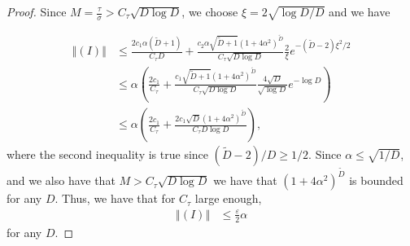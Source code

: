 \documentclass[12pt]{article}
\theoremstyle{remark}
\newcommand{\eps}{\varepsilon}
\newcommand{\norm}[1]{\left\Vert #1 \right\Vert}
\newcommand{\wtilde}[1]{\widetilde{#1}}
\newcommand{\stau}{\tau}
\begin{document}
\begin{appendices}
\begin{proof}
Since $M = \frac{\tau}{\sigma}>C_\stau\sqrt{D \log D}$, we choose $\xi = 2\sqrt{\log D/D}$ and we have

\begin{align*}
    \norm{(I)} 
&\leq \frac{2c_1 \alpha(\wtilde D+1)}{C_\stau D} + \frac{c_2 \alpha \sqrt{\wtilde D+1}( 1 + 4\alpha^2)^{\wtilde D} }
{C_\stau\sqrt{D \log D}}\frac{2}{\xi}e^{-(\wtilde D - 2 )\xi^2/2}
\\
&\leq \alpha\left(\frac{2c_1 }{C_\stau} + \frac{c_1 \sqrt{\wtilde D+1}( 1 + 4\alpha^2)^{\wtilde D} } 
{C_\stau\sqrt{D\log D }}\frac{4\sqrt{D}}{\sqrt{\log D}}e^{-\log D}\right)
\\
&\leq \alpha\left(\frac{2c_1 }{C_\stau} + \frac{2c_1 \sqrt{D}( 1 + 4\alpha^2)^{\wtilde D} }
{C_\stau D\log D }\right)
,\end{align*}
where the second inequality is true since  $(\wtilde D-2)/D \geq 1/2$.
Since $\alpha \leq  \sqrt{1/D} $, and we also have that $M>C_\stau\sqrt{D \log D}$ we have that 
$( 1 + 4\alpha^2)^{\wtilde D}$ is bounded for any $D$. Thus, we have that for $C_\stau$ large enough, 
\begin{align}
\norm{(I)} 
&\leq \frac{\eps}{2}\alpha
\end{align}
for any $D$.



\end{proof}
\end{appendices}
\end{document}
